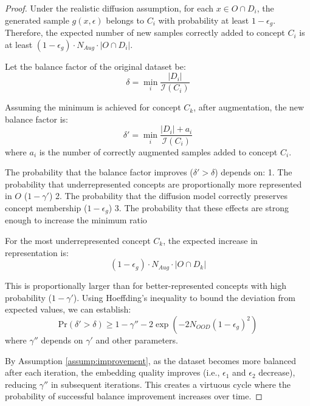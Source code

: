 \begin{proof}
\noindent
Under the realistic diffusion assumption, for each $x \in O \cap D_i$, the generated sample $g(x, \epsilon)$ belongs to $C_i$ with probability at least $1 - \epsilon_g$. Therefore, the expected number of new samples correctly added to concept $C_i$ is at least $(1 - \epsilon_g) \cdot N_{Aug} \cdot |O \cap D_i|$.

\noindent
Let the balance factor of the original dataset be:
\begin{equation}
\delta = \min_{i} \frac{|D_i|}{\mathcal{I}(C_i)}
\end{equation}

\noindent
Assuming the minimum is achieved for concept $C_k$, after augmentation, the new balance factor is:
\begin{equation}
\delta' = \min_{i} \frac{|D_i| + a_i}{\mathcal{I}(C_i)}
\end{equation}
where $a_i$ is the number of correctly augmented samples added to concept $C_i$.

\noindent
The probability that the balance factor improves ($\delta' > \delta$) depends on:
1. The probability that underrepresented concepts are proportionally more represented in $O$ ($1 - \gamma'$)
2. The probability that the diffusion model correctly preserves concept membership ($1 - \epsilon_g$)
3. The probability that these effects are strong enough to increase the minimum ratio

\noindent
For the most underrepresented concept $C_k$, the expected increase in representation is:
\begin{equation}
(1 - \epsilon_g) \cdot N_{Aug} \cdot |O \cap D_k|
\end{equation}

\noindent
This is proportionally larger than for better-represented concepts with high probability ($1 - \gamma'$). Using Hoeffding's inequality to bound the deviation from expected values, we can establish:
\begin{equation}
\mathrm{Pr}(\delta' > \delta) \geq 1 - \gamma'' - 2\exp(-2N_{OOD}(1-\epsilon_g)^2)
\end{equation}
where $\gamma''$ depends on $\gamma'$ and other parameters.

\noindent
By Assumption \ref{assump:improvement}, as the dataset becomes more balanced after each iteration, the embedding quality improves (i.e., $\epsilon_1$ and $\epsilon_2$ decrease), reducing $\gamma''$ in subsequent iterations. This creates a virtuous cycle where the probability of successful balance improvement increases over time.


\end{proof}
